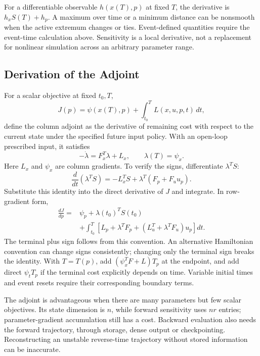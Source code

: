 For a differentiable observable $h(x(T),p)$ at fixed $T$, the derivative is $h_xS(T)+h_p$. A maximum over time or a minimum distance can be nonsmooth when the active extremum changes or ties. Event-defined quantities require the event-time calculation above. Sensitivity is a local derivative, not a replacement for nonlinear simulation across an arbitrary parameter range.

\subsection{Derivation of the Adjoint}

For a scalar objective at fixed $t_0,T$,
\begin{equation}
J(p)=\psi(x(T),p)+\int_{t_0}^T L(x,u,p,t)\,dt,
\end{equation}
define the column adjoint as the derivative of remaining cost with respect to the current state under the specified future input policy. With an open-loop prescribed input, it satisfies
\begin{equation}
-\dot\lambda=F_x^T\lambda+L_x,
\qquad \lambda(T)=\psi_x.
\label{eq:ch2:adjoint}
\end{equation}
Here $L_x$ and $\psi_x$ are column gradients. To verify the signs, differentiate $\lambda^TS$:
\begin{equation}
\frac{d}{dt}(\lambda^TS)=-L_x^TS+\lambda^T(F_p+F_uu_p).
\end{equation}
Substitute this identity into the direct derivative of $J$ and integrate. In row-gradient form,
\begin{equation}
\begin{split}
\frac{dJ}{dp}={}&\psi_p+\lambda(t_0)^TS(t_0)\\
&+\int_{t_0}^T\left[L_p+\lambda^TF_p+
(L_u^T+\lambda^TF_u)u_p\right]dt.
\end{split}
\label{eq:ch2:grad-adjoint}
\end{equation}
The terminal plus sign follows from this convention. An alternative Hamiltonian convention can change signs consistently; changing only the terminal sign breaks the identity. With $T=T(p)$, add $(\psi_x^TF+L)T_p$ at the endpoint, and add direct $\psi_tT_p$ if the terminal cost explicitly depends on time. Variable initial times and event resets require their corresponding boundary terms.

The adjoint is advantageous when there are many parameters but few scalar objectives. Its state dimension is $n$, while forward sensitivity uses $nr$ entries; parameter-gradient accumulation still has a cost. Backward evaluation also needs the forward trajectory, through storage, dense output or checkpointing. Reconstructing an unstable reverse-time trajectory without stored information can be inaccurate.

